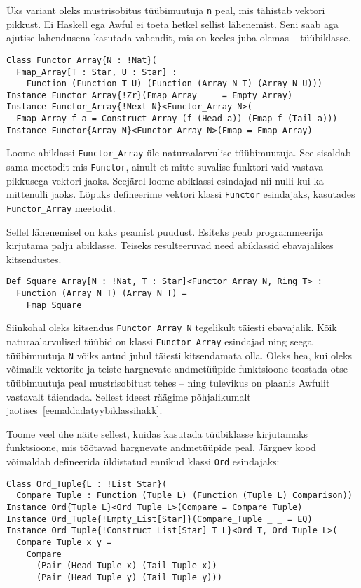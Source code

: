 \documentclass[12pt]{article}
\begin{document}
      Üks variant oleks mustrisobitus tüübimuutuja \verb!n! peal, mis tähistab vektori pikkust. Ei Haskell ega Awful ei toeta hetkel sellist lähenemist. Seni saab aga ajutise lahendusena kasutada vahendit, mis on keeles juba olemas -- tüübiklasse.

      \begin{verbatim}Class Functor_Array{N : !Nat}(
  Fmap_Array[T : Star, U : Star] :
    Function (Function T U) (Function (Array N T) (Array N U)))
Instance Functor_Array{!Zr}(Fmap_Array _ _ = Empty_Array)
Instance Functor_Array{!Next N}<Functor_Array N>(
  Fmap_Array f a = Construct_Array (f (Head a)) (Fmap f (Tail a)))
Instance Functor{Array N}<Functor_Array N>(Fmap = Fmap_Array)\end{verbatim}

      Loome abiklassi \verb!Functor_Array! üle naturaalarvulise tüübimuutuja. See sisaldab sama meetodit mis \verb!Functor!, ainult et mitte suvalise funktori vaid vastava pikkusega vektori jaoks. Seejärel loome abiklassi esindajad nii nulli kui ka mittenulli jaoks. Lõpuks defineerime vektori klassi \verb!Functor! esindajaks, kasutades \verb!Functor_Array! meetodit.

      Sellel lähenemisel on kaks peamist puudust. Esiteks peab programmeerija kirjutama palju abiklasse. Teiseks resulteeruvad need abiklassid ebavajalikes kitsendustes.

      \begin{verbatim}Def Square_Array[N : !Nat, T : Star]<Functor_Array N, Ring T> :
  Function (Array N T) (Array N T) =
    Fmap Square\end{verbatim}

      Siinkohal oleks kitsendus \verb!Functor_Array N! tegelikult täiesti ebavajalik. Kõik naturaalarvulised tüübid on klassi \verb!Functor_Array! esindajad ning seega tüübimuutuja \verb!N! võiks antud juhul täiesti kitsendamata olla. Oleks hea, kui oleks võimalik vektorite ja teiste hargnevate andmetüüpide funktsioone teostada otse tüübimuutuja peal mustrisobitust tehes -- ning tulevikus on plaanis Awfulit vastavalt täiendada. Sellest ideest räägime põhjalikumalt jaotises~\ref{eemaldadatyybiklassihakk}.

      Toome veel ühe näite sellest, kuidas kasutada tüübiklasse kirjutamaks funktsioone, mis töötavad hargnevate andmetüüpide peal. Järgnev kood võimaldab defineerida üldistatud ennikud klassi \verb!Ord! esindajaks:

      \begin{verbatim}Class Ord_Tuple{L : !List Star}(
  Compare_Tuple : Function (Tuple L) (Function (Tuple L) Comparison))
Instance Ord{Tuple L}<Ord_Tuple L>(Compare = Compare_Tuple)
Instance Ord_Tuple{!Empty_List[Star]}(Compare_Tuple _ _ = EQ)
Instance Ord_Tuple{!Construct_List[Star] T L}<Ord T, Ord_Tuple L>(
  Compare_Tuple x y =
    Compare
      (Pair (Head_Tuple x) (Tail_Tuple x))
      (Pair (Head_Tuple y) (Tail_Tuple y)))\end{verbatim}
\end{document}
